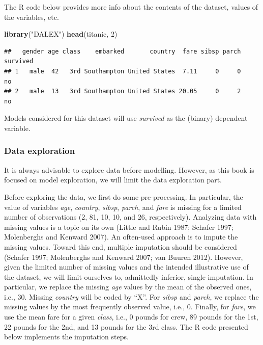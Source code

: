 \documentclass[12pt,]{krantz}
\newenvironment{Shaded}{\begin{snugshade}}{\end{snugshade}}
\newcommand{\DecValTok}[1]{\textcolor[rgb]{0.00,0.00,0.81}{#1}}
\newcommand{\KeywordTok}[1]{\textcolor[rgb]{0.13,0.29,0.53}{\textbf{#1}}}
\newcommand{\NormalTok}[1]{#1}
\newcommand{\StringTok}[1]{\textcolor[rgb]{0.31,0.60,0.02}{#1}}
\begin{document}
The R code below provides more info about the contents of the dataset, values of the variables, etc.

\begin{Shaded}
\begin{Highlighting}[]
\KeywordTok{library}\NormalTok{(}\StringTok{"DALEX"}\NormalTok{)}
\KeywordTok{head}\NormalTok{(titanic, }\DecValTok{2}\NormalTok{)}
\end{Highlighting}
\end{Shaded}

\begin{verbatim}
##   gender age class    embarked       country  fare sibsp parch survived
## 1   male  42   3rd Southampton United States  7.11     0     0       no
## 2   male  13   3rd Southampton United States 20.05     0     2       no
\end{verbatim}

Models considered for this dataset will use \emph{survived} as the (binary) dependent variable.

\hypertarget{exploration-titanic}{%
\subsubsection{Data exploration}\label{exploration-titanic}}

It is always advisable to explore data before modelling. However, as this book is focused on model exploration, we will limit the data exploration part.

Before exploring the data, we first do some pre-processing. In particular, the value of variables \emph{age}, \emph{country}, \emph{sibsp}, \emph{parch}, and \emph{fare} is missing for a limited number of observations (2, 81, 10, 10, and 26, respectively). Analyzing data with missing values is a topic on its own (Little and Rubin 1987; Schafer 1997; Molenberghs and Kenward 2007). An often-used approach is to impute the missing values. Toward this end, multiple imputation should be considered (Schafer 1997; Molenberghs and Kenward 2007; van Buuren 2012). However, given the limited number of missing values and the intended illustrative use of the dataset, we will limit ourselves to, admittedly inferior, single imputation. In particular, we replace the missing \emph{age} values by the mean of the observed ones, i.e., 30. Missing \emph{country} will be coded by ``X''. For \emph{sibsp} and \emph{parch}, we replace the missing values by the most frequently observed value, i.e., 0. Finally, for \emph{fare}, we use the mean fare for a given \emph{class}, i.e., 0 pounds for crew, 89 pounds for the 1st, 22 pounds for the 2nd, and 13 pounds for the 3rd class. The R code presented below implements the imputation steps.
\end{document}
